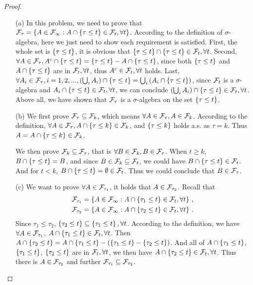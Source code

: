 \begin{proof}

\begin{enumerate}
   \item[(a)] In this problem, we need to prove that $\mathcal{F}_\tau = \left\{ A \in \mathcal{F}_{\infty}: A\cap \left\{ \tau \le t \right\} \in \mathcal{F}_t, \forall t \right\}$. According to the definition of $\sigma$-algebra, here we just need to show each requirement is satisfied. First, the whole set is $\left\{ \tau\le t \right\}$, it is obvious that $\left\{ \tau\le t \right\} \cap \left\{ \tau\le t \right\} \in \mathcal{F}_t,\forall t$. Second, $\forall A \in \mathcal{F}_\tau, A^c\cap \left\{ \tau \le t \right\} = \left\{ \tau \le t \right\} - A\cap \left\{ \tau \le t \right\}$, since both $\left\{ \tau \le t \right\}$ and $A\cap \left\{ \tau \le t \right\}$ are in $\mathcal{F}_t,\forall t$, thus $A^c \in \mathcal{F}_t, \forall t$ holds. Last, $\forall A_i \in \mathcal{F}_\tau, i=1,2,..., \left(\bigcup_i A_i\right) \cap \left\{ \tau \le t \right\} = \bigcup_i \left( A_i \cap \left\{ \tau \le t \right\}\right)$, since $\mathcal{F}_t$ is a $\sigma$-algebra and $ A_i \cap \left\{ \tau \le t \right\} \in \mathcal{F}_t, \forall t$, we can conclude $\left(\bigcup_i A_i\right) \cap \left\{ \tau \le t \right\} \in \mathcal{F}_t, \forall t$. Above all, we have shown that $\mathcal{F}_{\tau}$ is a $\sigma$-algebra on the set $\left\{ \tau \le t \right\}$. 
   \item[(b)] We first prove $\mathcal{F}_\tau \subseteq \mathcal{F}_k$, which means $\forall A \in \mathcal{F}_\tau, A \in \mathcal{F}_k$. According to the definition, $\forall A \in \mathcal{F}_\tau, A \cap \left\{ \tau \le k \right\}\in \mathcal{F}_k$, and $\left\{ \tau \le k \right\}$ holds a.s. as $\tau=k$. Thus $A = A \cap \left\{ \tau \le k \right\} \in \mathcal{F}_k$. 

    We then prove $\mathcal{F}_k \subseteq \mathcal{F}_\tau$, that is $\forall B \in \mathcal{F}_k, B \in \mathcal{F}_\tau$. When $t \ge k$, $B \cap \left\{ \tau \le t \right\} = B$, and since $B \in \mathcal{F}_k \subseteq \mathcal{F}_t$, we could have $B \cap \left\{ \tau \le t \right\} \in \mathcal{F}_t$. And for $t<k$, $B \cap \left\{ \tau \le t \right\} = \emptyset \in \mathcal{F}_t$. Thus we could conclude that $B \in \mathcal{F}_\tau$. 

   \item[(c)] We want to prove $\forall A \in \mathcal{F}_{\tau_1}$, it holds that $A \in \mathcal{F}_{\tau_2}$. Recall that 
   \begin{align*}
      \mathcal{F}_{\tau_1} = \left\{ A \in \mathcal{F}_{\infty}: A\cap \left\{ \tau_1 \le t \right\} \in \mathcal{F}_t, \forall t \right\}\,,\\
      \mathcal{F}_{\tau_2} = \left\{ A \in \mathcal{F}_{\infty}: A\cap \left\{ \tau_2 \le t \right\} \in \mathcal{F}_t, \forall t \right\}\,.
   \end{align*}
   Since $\tau_1 \le \tau_2$, $\left\{ \tau_2 \le t \right\} \subseteq \left\{ \tau_1\le t \right\},\forall t$. According to the definition, we have $\forall A \in \mathcal{F}_{\tau_1}$, $A \cap \left\{ \tau_1 \le t \right\} \in \mathcal{F}_t, \forall t$. Then $A \cap \left\{ \tau_2 \le t \right\} = A\cap \left\{ \tau_1 \le t \right\} - \left(\left\{ \tau_1 \le t \right\} - \left\{ \tau_2 \le t \right\}\right)$. And all of $A\cap \left\{ \tau_1 \le t \right\}$, $\left\{ \tau_1 \le t \right\}$, $\left\{ \tau_2 \le t \right\}$ are in $\mathcal{F}_t,\forall t$, we then have $A \cap \left\{ \tau_2 \le t \right\} \in \mathcal{F}_t,\forall t$. Thus there is $A \in \mathcal{F}_{\tau_2}$ and further $\mathcal{F}_{\tau_1} \subseteq \mathcal{F}_{\tau_2}$. 





\end{enumerate}
\end{proof}
